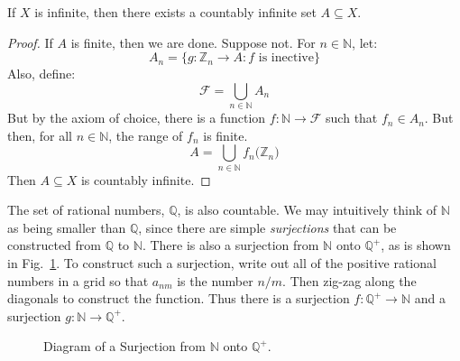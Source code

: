\documentclass[crop=false,class=book,oneside]{standalone}
\begin{document}
            \begin{theorem}
                If $X$ is infinite, then there exists a
                countably infinite set $A\subseteq{X}$.
            \end{theorem}
            \begin{proof}
                If $A$ is finite, then we are done. Suppose not.
                For $n\in\mathbb{N}$, let:
                \begin{equation}
                    A_{n}
                    =\{g:\mathbb{Z}_{n}\rightarrow{A}:f\textrm{ is inective}\}
                \end{equation}
                Also, define:
                \begin{equation}
                    \mathcal{F}=\bigcup_{n\in\mathbb{N}}A_{n}
                \end{equation}
                But by the axiom of choice, there is a function
                $f:\mathbb{N}\rightarrow\mathcal{F}$ such that
                $f_{n}\in{A}_{n}$. But then, for all
                $n\in\mathbb{N}$, the range of $f_{n}$ is finite.
                \begin{equation}
                    A=\bigcup_{n\in\mathbb{N}}f_{n}
                        \Big(\mathbb{Z}_{n}\Big)
                \end{equation}
                Then $A\subseteq{X}$ is countably infinite.
            \end{proof}
            The set of rational numbers, $\mathbb{Q}$, is also
            countable. We may intuitively think of $\mathbb{N}$
            as being smaller than $\mathbb{Q}$, since there are
            simple \textit{surjections} that can be constructed
            from $\mathbb{Q}$ to $\mathbb{N}$. There is also a
            surjection from $\mathbb{N}$ onto $\mathbb{Q}^{+}$,
            as is shown in Fig.~\ref{fig:Bijection_N_and_Q_Plus}.
            To construct such a surjection, write out all of the
            positive rational numbers in a grid so that $a_{nm}$
            is the number $n/m$. Then zig-zag along the diagonals
            to construct the function. Thus there is a surjection
            $f:\mathbb{Q}^{+}\rightarrow\mathbb{N}$
            and a surjection
            $g:\mathbb{N}\rightarrow\mathbb{Q}^{+}$.
            \begin{figure}[H]
                \centering
                \captionsetup{type=figure}
                \caption{Diagram of a Surjection from
                         $\mathbb{N}$ onto $\mathbb{Q}^{+}$.}
                \label{fig:Bijection_N_and_Q_Plus}
            \end{figure}
\end{document}
